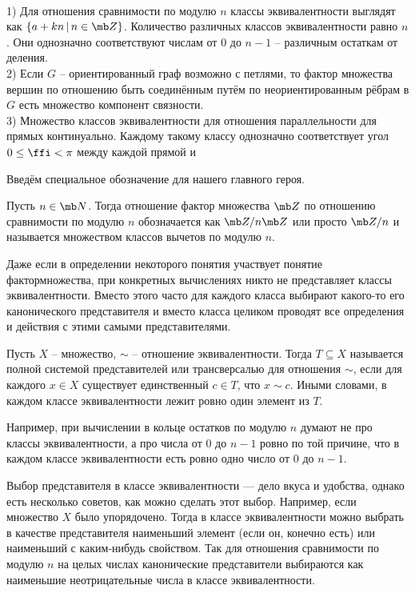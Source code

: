 \exm\\
1) Для отношения сравнимости по модулю $n$ классы эквивалентности выглядят как $\{a+kn\,|\, n \in \mb Z\}$. Количество различных классов эквивалентности равно $n$. Они однозначно соответствуют числам от $0$ до $n-1$ -- различным остаткам от деления.\\
2) Если $G$ -- ориентированный граф возможно с петлями, то фактор множества вершин по отношению быть соединённым путём по неориентированным рёбрам в $G$ есть множество компонент связности.\\
3) Множество классов эквивалентности для отношения параллельности для прямых континуально. Каждому такому классу однозначно соответствует угол $0\leq \ffi<\pi $ между каждой прямой и 


Введём специальное обозначение для нашего главного героя.

\dfn Пусть $n\in \mb N$. Тогда отношение фактор множества $\mb Z$ по отношению сравнимости по модулю $n$ обозначается как $\mb Z/n\mb Z$ или просто $\mb Z/n$ и называется множеством классов вычетов по модулю $n$.
\edfn

Даже если в определении некоторого понятия участвует понятие фактормножества, при конкретных вычислениях никто не представляет классы эквивалентности. Вместо этого часто для каждого класса выбирают какого-то его канонического представителя и вместо класса целиком проводят все определения и действия с этими самыми представителями. 

\dfn Пусть $X$ -- множество, $\sim$ -- отношение эквивалентности. Тогда $T\subseteq X$ называется полной системой представителей или трансверсалью для отношения $\sim$, если для каждого $x \in X$ существует единственный $c\in T$, что $x\sim c$. Иными словами, в каждом классе эквивалентности лежит ровно один элемент из $T$.
\edfn

Например, при вычислении в кольце остатков по модулю $n$ думают не про классы эквивалентности, а про числа от $0$ до $n-1$ ровно по той причине, что в каждом классе эквивалентности есть ровно одно число от $0$ до $n-1$.

Выбор представителя в классе эквивалентности --- дело вкуса и удобства, однако есть несколько советов, как можно сделать этот выбор. Например, если множество $X$ было упорядочено. Тогда в классе эквивалентности можно выбрать в качестве представителя наименьший элемент (если он, конечно есть) или наименьший с каким-нибудь свойством. Так для отношения сравнимости по модулю $n$ на целых числах канонические представители выбираются как наименьшие неотрицательные числа в классе эквивалентности.


